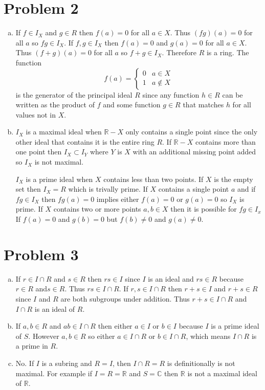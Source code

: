 \documentclass{article}
\begin{document}
\section*{Problem 2}
\begin{enumerate}[(a)]
	\item If $f \in I_X$ and $g \in R$ then $f(a) = 0$ for all $a \in X$.
	Thus $(fg)(a) = 0$ for all $a$ so $fg \in I_X$.
	If $f,g \in I_X$ then $f(a) = 0$ and $g(a) = 0$ for all $a \in X$.
	Thus $(f+g)(a) = 0$ for all $a$ so $f+g \in I_X$.
	Therefore $R$ is a ring.
	The function 
	\[
		f(a) = \begin{cases}
			0 & a \in X \\
			1 & a \notin X
		\end{cases}
	\]
	is the generator of the principal ideal $R$ since any function $h \in R$
	can be written as the product of $f$ and some function $g \in R$ that matches $h$
	for all values not in $X$.
	\item $I_X$ is a maximal ideal when $\mathbb{R} - X$ only contains a single point
	since the only other ideal that contains it is the entire ring $R$.
	If $\mathbb{R} - X$ contains more than one point then $I_X \subset I_Y$ where $Y$
	is $X$ with an additional missing point added so $I_X$ is not maximal.

	$I_X$ is a prime ideal when $X$ contains less than two points. 
	If $X$ is the empty set then $I_X = R$ which is trivally prime.
	If $X$ contains a single point $a$ and
	if $fg \in I_X$ then $fg(a) = 0$ implies either $f(a) = 0$ or $g(a) = 0$ so $I_X$ is prime.
	If $X$ contains two or more points $a,b \in X$ then it is possible for $fg \in I_x$
	If $f(a) = 0$ and $g(b) = 0$ but $f(b) \neq 0$ and $g(a) \neq 0$.
\end{enumerate}
\newpage 

\section*{Problem 3}
\begin{enumerate}[(a)]
	\item If $r \in I \cap R$ and $s \in R$ then $rs \in I$ since $I$ is an ideal 
	and $rs \in R$ because $r \in R$ and$s \in R$.
	Thus $rs \in I \cap R$.
	If $r,s \in I \cap R$ then $r+s \in I$ and $r+s \in R$ since $I$ and $R$ are both subgroups under addition.
	Thus $r+s \in I \cap R$ and $I \cap R$ is an ideal of $R$.
	\item If $a,b \in R$ and $ab \in I \cap R$ then either $a \in I$ or $b \in I$ because $I$ is a prime ideal of $S$.
	However $a,b \in R$ so either $a \in I \cap R$ or $b \in I \cap R$, which means $I \cap R$ is a prime in $R$.
	\item No. If $I$ is a subring and $R=I$, then $I \cap R = R$ is definitionally is not maximal.
	For example if $I = R = \mathbb{R}$ and $S = \mathbb{C}$ then $\mathbb{R}$ is not a maximal ideal of $\mathbb{R}$.
\end{enumerate}
\end{document}
